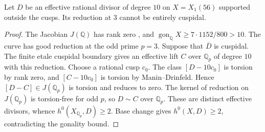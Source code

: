 \begin{lemma}
Let $D$ be an effective rational divisor of degree $10$ on
$X=X_1(56)$ supported outside the cusps.
Its reduction at 3 cannot be entirely cuspidal.
\end{lemma}
\begin{proof}
The Jacobian $J(\mathbb Q)$ has rank zero
\cite[Theorem~3.1(2)]{DEHMZ}, and $\operatorname{gon}_{\mathbb Q}X\geq 7\cdot1152/800>10$.
The curve has good reduction at the odd prime $p=3$.
Suppose that $\overline D$ is cuspidal. The finite etale cuspidal
boundary gives an effective lift $C$ over $\mathbb Q_p$ of degree
$10$ with this reduction. Choose a rational cusp $c_0$.
The class $[D-10c_0]$ is torsion by rank zero, and
$[C-10c_0]$ is torsion by Manin--Drinfeld. Hence
$[D-C]\in J(\mathbb Q_p)$ is torsion and reduces to zero.
The kernel of reduction on $J(\mathbb Q_p)$ is torsion-free
for odd $p$, so $D\sim C$ over $\mathbb Q_p$.
These are distinct effective divisors, whence
$h^0(X_{\mathbb Q_p},D)\geq2$. Base change gives
$h^0(X,D)\geq2$, contradicting the gonality bound.
\end{proof}

